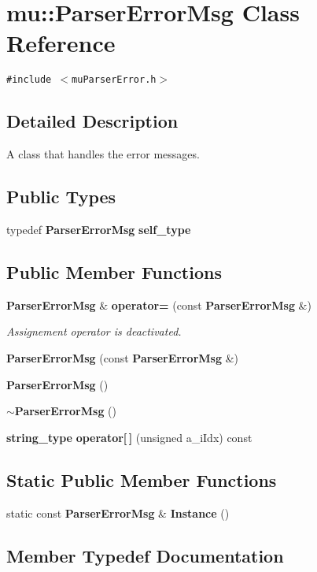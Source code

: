 \section{mu::ParserErrorMsg Class Reference}
\label{classmu_1_1ParserErrorMsg}
{\tt \#include $<$muParserError.h$>$}



\subsection{Detailed Description}
A class that handles the error messages. \subsection*{Public Types}
\begin{CompactItemize}
\item 
typedef {\bf ParserErrorMsg} {\bf self\_\-type}
\end{CompactItemize}
\subsection*{Public Member Functions}
\begin{CompactItemize}
\item 
{\bf ParserErrorMsg} \& {\bf operator=} (const {\bf ParserErrorMsg} \&)
\begin{CompactList}\small\item\em Assignement operator is deactivated. \item\end{CompactList}\item 
{\bf ParserErrorMsg} (const {\bf ParserErrorMsg} \&)
\item 
{\bf ParserErrorMsg} ()
\item 
{\bf $\sim$ParserErrorMsg} ()
\item 
{\bf string\_\-type} {\bf operator[$\,$]} (unsigned a\_\-iIdx) const 
\end{CompactItemize}
\subsection*{Static Public Member Functions}
\begin{CompactItemize}
\item 
static const {\bf ParserErrorMsg} \& {\bf Instance} ()
\end{CompactItemize}


\subsection{Member Typedef Documentation}
